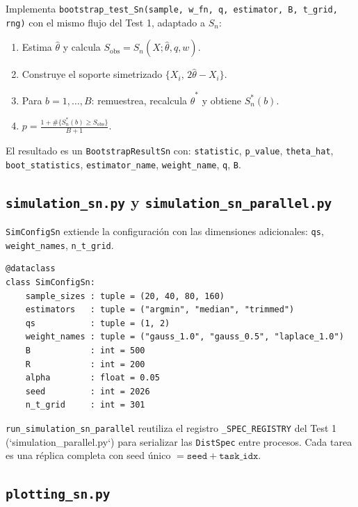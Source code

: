 \documentclass[11pt,a4paper]{article}
\begin{document}
Implementa \texttt{bootstrap\_test\_Sn(sample, w\_fn, q, estimator, B, t\_grid, rng)}
con el mismo flujo del Test 1, adaptado a $S_n$:
\begin{enumerate}[leftmargin=*]
    \item Estima $\hat\theta$ y calcula $S_{\text{obs}}=S_n(X;\hat\theta,q,w)$.
    \item Construye el soporte simetrizado $\{X_i,\,2\hat\theta-X_i\}$.
    \item Para $b=1,\dots,B$: remuestrea, recalcula $\hat\theta^*$ y obtiene $S_n^*(b)$.
    \item $p = \frac{1+\#\{S_n^*(b)\ge S_{\text{obs}}\}}{B+1}$.
\end{enumerate}
El resultado es un \texttt{BootstrapResultSn} con: \texttt{statistic},
\texttt{p\_value}, \texttt{theta\_hat}, \texttt{boot\_statistics},
\texttt{estimator\_name}, \texttt{weight\_name}, \texttt{q}, \texttt{B}.

\subsection{\texttt{simulation\_sn.py} y \texttt{simulation\_sn\_parallel.py}}

\texttt{SimConfigSn} extiende la configuración con las dimensiones
adicionales: \texttt{qs}, \texttt{weight\_names}, \texttt{n\_t\_grid}.

\begin{lstlisting}[style=pystyle]
@dataclass
class SimConfigSn:
    sample_sizes : tuple = (20, 40, 80, 160)
    estimators   : tuple = ("argmin", "median", "trimmed")
    qs           : tuple = (1, 2)
    weight_names : tuple = ("gauss_1.0", "gauss_0.5", "laplace_1.0")
    B            : int = 500
    R            : int = 200
    alpha        : float = 0.05
    seed         : int = 2026
    n_t_grid     : int = 301
\end{lstlisting}

\texttt{run\_simulation\_sn\_parallel} reutiliza el registro
\texttt{\_SPEC\_REGISTRY} del Test 1 (`simulation\_parallel.py`) para
serializar las \texttt{DistSpec} entre procesos. Cada tarea es una
réplica completa con seed único $=\texttt{seed}+\texttt{task\_idx}$.

\subsection{\texttt{plotting\_sn.py}}
\end{document}
